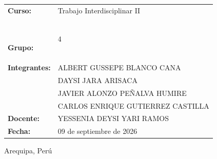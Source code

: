 \begin{titlepage}
    \centering

    {\Large\bfseries \universidad\par}
    \vspace{0.8cm}

    {\large \escuela\par}

    \vfill

    {\LARGE\bfseries \tituloInforme\par}
    \vspace{0.7cm}

    {\Large \nombreProyecto\par}

    \vspace{1cm}

    \vfill

    \begin{tabular}{@{}ll@{}}

        \textbf{Curso:} 
        & Trabajo Interdisciplinar II \\[0.4cm]\
        
        \textbf{Grupo:} 
        & 4         \\[0.4cm]

        \textbf{Integrantes:} 
        & ALBERT GUSSEPE BLANCO CANA \\

        & DAYSI JARA ARISACA \\

        & JAVIER ALONZO PEÑALVA HUMIRE \\

        & CARLOS ENRIQUE GUTIERREZ CASTILLA \\[0.4cm]

        \textbf{Docente:} 
        & YESSENIA DEYSI YARI RAMOS \\[0.4cm]

        \textbf{Fecha:} 
        & 09 de septiembre de 2026 \\

    \end{tabular}

    \vspace{1.5cm}

    {Arequipa, Perú\par}

\end{titlepage}